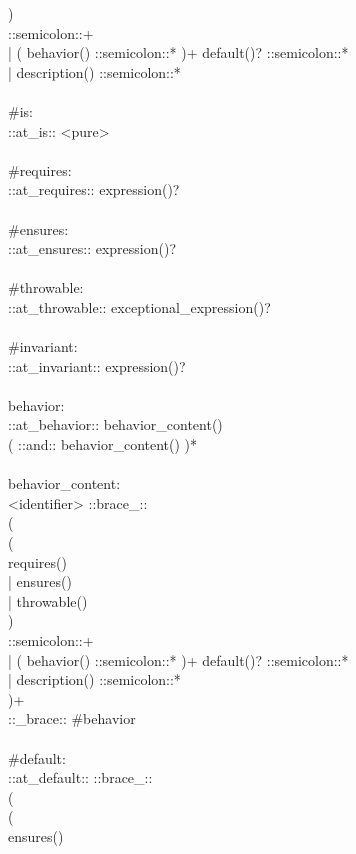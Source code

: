 \begin{bigbigpre}
    ) \\
    ::semicolon::+ \\
  | ( behavior() ::semicolon::* )+ default()? ::semicolon::* \\
  | description() ::semicolon::* \\
 \\
#is: \\
    ::at_is:: <pure> \\
 \\
#requires: \\
    ::at_requires:: expression()? \\
 \\
#ensures: \\
    ::at_ensures:: expression()? \\
 \\
#throwable: \\
    ::at_throwable:: exceptional_expression()? \\
 \\
#invariant: \\
    ::at_invariant:: expression()? \\
 \\
behavior: \\
    ::at_behavior:: behavior_content() \\
    ( ::and:: behavior_content() )* \\
 \\
behavior_content: \\
    <identifier> ::brace_:: \\
    ( \\
        ( \\
            requires() \\
          | ensures() \\
          | throwable() \\
        ) \\
        ::semicolon::+ \\
      | ( behavior() ::semicolon::* )+ default()? ::semicolon::* \\
      | description() ::semicolon::* \\
    )+ \\
    ::_brace:: #behavior \\
 \\
#default: \\
    ::at_default:: ::brace_:: \\
    ( \\
        ( \\
            ensures() \\

\end{bigbigpre}

